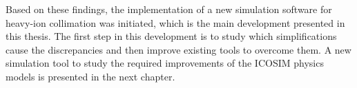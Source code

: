 Based on these findings, the implementation of a new simulation software for heavy-ion collimation was initiated, which is the main development presented in this thesis. The first step in this development is to study which simplifications cause the discrepancies and then improve existing tools to overcome them. A new simulation tool to study the required improvements of the ICOSIM physics models is presented in the next chapter.